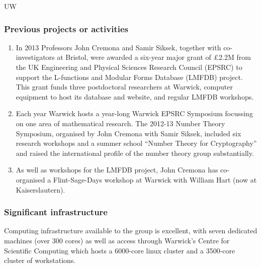\begin{sitedescription}{UW}
\subsubsection*{Previous projects or activities}

\begin{enumerate}
\item
In 2013 Professors John Cremona and Samir Siksek, together with
co-investigators at Bristol, were awarded a six-year major grant of
£2.2M from the UK Engineering and Physical Sciences Research Council
(EPSRC) to support the L-functions and Modular Forms Database (LMFDB)
project.  This grant funds three postdoctoral researchers at Warwick,
computer equipment to host its database and website, and regular LMFDB
workshops.
\item
Each year Warwick hosts a year-long Warwick EPSRC Symposium focussing
on one area of mathematical research.  The 2012-13 Number Theory
Symposium, organised by John Cremona with Samir Siksek, included six
research workshops and a summer school ``Number Theory for
Cryptography'' and raised the international profile of the number
theory group substantially.
\item
As well as workshops for the LMFDB project, John Cremona has
co-organised a Flint-Sage-Days workshop at Warwick with William Hart
(now at Kaiserslautern).
\end{enumerate}

\subsubsection*{Significant infrastructure}

Computing infrastructure available to the group is excellent, with
seven dedicated machines (over 300 cores) as well as access through
Warwick's Centre for Scientific Computing which hosts a 6000-core
linux cluster and a 3500-core cluster of workstations.
\end{sitedescription}

\begin{draft}
\end{draft}






